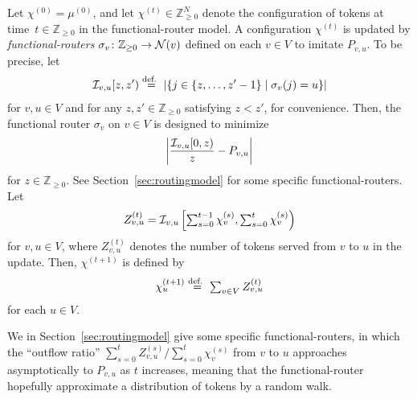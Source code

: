 \documentclass[letter, 11pt]{article}
\newcommand{\defeq}{\stackrel{\mbox{\scriptsize{\normalfont\rmfamily def. }}}{=}}
\newcommand{\1}{\mbox{1}\hspace{-0.25em}\mbox{l}}
\newcommand{\I}{{\cal I}} \newcommand{\C}{{\cal C}} \newcommand{\dtv}{{\cal D}_{\rm tv}}
\begin{document}
Let $\chi^{(0)}=\mu^{(0)}$, and 
 let $\chi^{(t)} \in \mathbb{Z}_{\geq 0}^N$ denote the configuration of tokens 
   at time~$t \in \mathbb{Z}_{\geq 0}$ in the functional-router model. 
 A configuration $\chi^{(t)}$ 
   is updated by {\em functional-routers} 
   $\sigma_v \colon \mathbb{Z}_{\geq 0} \to {\cal N}(v)$ defined on each $v \in V$ 
  to imitate $P_{v, u}$. 
To be precise, let
\begin{eqnarray}
 \I_{v, u}[z, z') \defeq \left|\left\{ j \in \{z, \ldots, z'-1\} \mid \sigma_v(j)=u \right\} \right|
 \label{def:Ivu}
\end{eqnarray}
for $v, u \in V$ and for any $z, z' \in \mathbb{Z}_{\geq 0}$ satisfying $z <z'$, 
  for convenience. 
 Then, the functional router $\sigma_v$ on $v\in V$ is designed to minimize 
\begin{eqnarray*}
\left|\frac{\I_{v, u}[0, z)}{z} - P_{v,u} \right|
\end{eqnarray*}
 for $z \in \mathbb{Z}_{\geq 0}$. 
See Section~\ref{sec:routingmodel} for some specific functional-routers. 
Let
\begin{eqnarray}\textstyle
 \Z_{v, u}^{(t)} = \I_{v, u}\left[ \sum_{s=0}^{t-1} \chi_v^{(s)}, \sum_{s=0}^{t} \chi_v^{(s)} \right) 
 \label{def:Zvut}
\end{eqnarray}
  for $v, u \in V$, 
 where $Z_{v, u}^{(t)}$ denotes the number of tokens served from $v$ to $u$ in the update. 
 Then, $\chi^{(t+1)}$ is defined by 
\begin{eqnarray}\textstyle
 \chi_u^{(t+1)} \defeq \sum_{v \in V} Z_{v, u}^{(t)}
 \label{eq:Zvut-vsum}
\end{eqnarray}
 for each $u \in V$. 

We in Section~\ref{sec:routingmodel} give some specific functional-routers, 
  in which the ``outflow ratio'' 
   $\sum_{s=0}^t Z_{v, u}^{(s)} / \sum_{s=0}^t \chi^{(s)}_v$ from $v$ to $u$ 
 approaches asymptotically to $P_{v, u}$ as $t$ increases, 
 meaning that the functional-router hopefully approximate a distribution of tokens by a random walk. 
\end{document}
